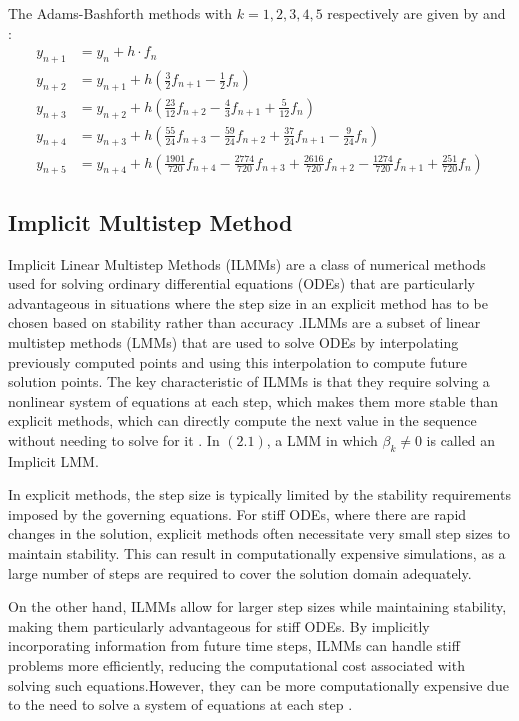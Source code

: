\documentclass[a4paper, twoside]{report} %
\begin{document}
	The Adams-Bashforth methods with $k=1,2,3,4,5$ respectively are given by \cite{butcher2003numerical} and \cite{hairer1993solving}:
	\begin{align}
		y_{n+1} & = y_n + h \cdot f_n \\
		y_{n+2} & = y_{n+1} + h \left(\frac{3}{2}f_{n+1} - \frac{1}{2}f_{n}\right) \\
		y_{n+3} & = y_{n+2} + h \left(\frac{23}{12}f_{n+2} - \frac{4}{3}f_{n+1} + \frac{5}{12}f_{n}\right) \\
		y_{n+4} & = y_{n+3} + h \left(\frac{55}{24}f_{n+3} - \frac{59}{24}f_{n+2} + \frac{37}{24}f_{n+1} - \frac{9}{24}f_{n}\right) \\
		y_{n+5} & = y_{n+4} + h \left(\frac{1901}{720}f_{n+4} - \frac{2774}{720}f_{n+3} + \frac{2616}{720}f_{n+2} - \frac{1274}{720}f_{n+1} + \frac{251}{720}f_{n}\right)
	\end{align}


	\subsection{Implicit Multistep Method}
	Implicit Linear Multistep Methods (ILMMs) are a class of numerical methods used for solving ordinary differential equations (ODEs) that are particularly advantageous in situations where the step size in an explicit method has to be chosen based on stability rather than accuracy \cite{alexander}.ILMMs are a subset of linear multistep methods (LMMs) that are used to solve ODEs by interpolating previously computed points and using this interpolation to compute future solution points. The key characteristic of ILMMs is that they require solving a nonlinear system of equations at each step, which makes them more stable than explicit methods, which can directly compute the next value in the sequence without needing to solve for it \cite{keller2020discovery}. In $(2.1)$, a LMM in which $\beta_k \neq 0$ is called an Implicit LMM.

	In explicit methods, the step size is typically limited by the stability requirements imposed by the governing equations. For stiff ODEs, where there are rapid changes in the solution, explicit methods often necessitate very small step sizes to maintain stability. This can result in computationally expensive simulations, as a large number of steps are required to cover the solution domain adequately.

	On the other hand, ILMMs allow for larger step sizes while maintaining stability, making them particularly advantageous for stiff ODEs. By implicitly incorporating information from future time steps, ILMMs can handle stiff problems more efficiently, reducing the computational cost associated with solving such equations.However, they can be more computationally expensive due to the need to solve a system of equations at each step \cite{thohura2013numerical}.
\end{document}
